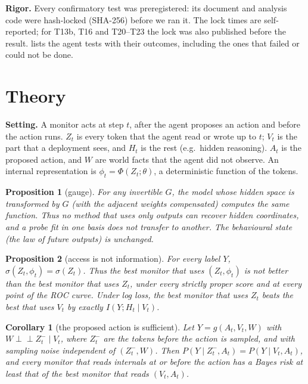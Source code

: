 \documentclass{article}
\newtheorem{proposition}{Proposition}
\newtheorem{corollary}{Corollary}
\newcommand{\indep}{\perp\!\!\!\perp}
\begin{document}
\textbf{Rigor.} Every confirmatory test was preregistered: its document and analysis code were hash-locked (SHA-256) before we ran it. The lock times are self-reported; for T13b, T16 and T20--T23 the lock was also published before the result.  lists the agent tests with their outcomes, including the ones that failed or could not be done.

\section{Theory}
\label{sec:theory}

\textbf{Setting.}
A monitor acts at step $t$, after the agent proposes an action and before the action runs.
$Z_t$ is every token that the agent read or wrote up to $t$; $V_t$ is the part that a deployment sees, and $H_t$ is the rest (e.g.\ hidden reasoning).
$A_t$ is the proposed action, and $W$ are world facts that the agent did not observe.
An internal representation is $\phi_t=\Phi(Z_t;\theta)$, a deterministic function of the tokens.

\begin{proposition}[gauge]\label{prop:gauge}
For any invertible $G$, the model whose hidden space is transformed by $G$ (with the adjacent weights compensated) computes the same function. Thus no method that uses only outputs can recover hidden coordinates, and a probe fit in one basis does not transfer to another. The behavioural state (the law of future outputs) is unchanged.
\end{proposition}

\begin{proposition}[access is not information]\label{prop:access}
For every label $Y$, $\sigma(Z_t,\phi_t)=\sigma(Z_t)$. Thus the best monitor that uses $(Z_t,\phi_t)$ is not better than the best monitor that uses $Z_t$, under every strictly proper score and at every point of the ROC curve. Under log loss, the best monitor that uses $Z_t$ beats the best that uses $V_t$ by exactly $I(Y;H_t\mid V_t)$.
\end{proposition}

\begin{corollary}[the proposed action is sufficient]\label{cor:action}
Let $Y=g(A_t,V_t,W)$ with $W\indep Z_t^-\mid V_t$, where $Z_t^-$ are the tokens before the action is sampled, and with sampling noise independent of $(Z_t^-,W)$. Then $P(Y\mid Z_t^-,A_t)=P(Y\mid V_t,A_t)$, and every monitor that reads internals at or before the action has a Bayes risk at least that of the best monitor that reads $(V_t,A_t)$.
\end{corollary}
\end{document}
